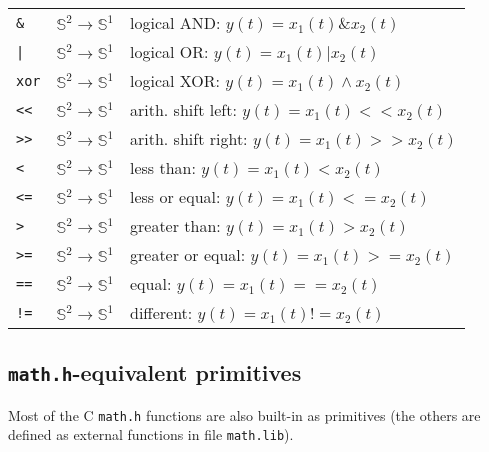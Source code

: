 \begin{tabular}{|l|l|l|}
\texttt{\&} & $\mathbb{S}^{2}\rightarrow\mathbb{S}^{1}$ & logical AND: $y(t)=x_{1}(t)\&x_{2}(t)$   \\
\texttt{|} & $\mathbb{S}^{2}\rightarrow\mathbb{S}^{1}$ & logical OR: $y(t)=x_{1}(t)|x_{2}(t)$   \\
\texttt{xor} & $\mathbb{S}^{2}\rightarrow\mathbb{S}^{1}$ & logical XOR: $y(t)=x_{1}(t)\land x_{2}(t)$   \\

\texttt{<}\texttt{<} & $\mathbb{S}^{2}\rightarrow\mathbb{S}^{1}$ & arith. shift left: $y(t)=x_{1}(t) << x_{2}(t)$   \\
\texttt{>}\texttt{>} & $\mathbb{S}^{2}\rightarrow\mathbb{S}^{1}$ & arith. shift right: $y(t)=x_{1}(t) >> x_{2}(t)$   \\


\texttt{<} & $\mathbb{S}^{2}\rightarrow\mathbb{S}^{1}$ & less than: $y(t)=x_{1}(t) < x_{2}(t)$   \\
\texttt{<=} & $\mathbb{S}^{2}\rightarrow\mathbb{S}^{1}$ & less or equal: $y(t)=x_{1}(t) <= x_{2}(t)$   \\
\texttt{>} & $\mathbb{S}^{2}\rightarrow\mathbb{S}^{1}$ & greater than: $y(t)=x_{1}(t) > x_{2}(t)$   \\
\texttt{>=} & $\mathbb{S}^{2}\rightarrow\mathbb{S}^{1}$ & greater or equal: $y(t)=x_{1}(t) >= x_{2}(t)$   \\
\texttt{==} & $\mathbb{S}^{2}\rightarrow\mathbb{S}^{1}$ & equal: $y(t)=x_{1}(t) == x_{2}(t)$   \\
\texttt{!=} & $\mathbb{S}^{2}\rightarrow\mathbb{S}^{1}$ & different: $y(t)=x_{1}(t) != x_{2}(t)$   \\

\hline

\end{tabular}

\bigskip

\subsection{\texttt{math.h}-equivalent primitives}

Most of the C \texttt{math.h} functions are also built-in as primitives (the others are defined as external functions in file \texttt{math.lib}).

